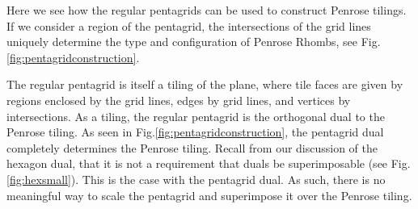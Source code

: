 \documentclass[
  oneside,
  11pt, a4paper,
  footinclude=true,
  headinclude=true,
  cleardoublepage=empty
]{scrbook}
\begin{document}
Here we see how the regular pentagrids can be used to construct Penrose tilings. If we consider a region of the pentagrid, the intersections of the grid lines uniquely determine the type and configuration of Penrose Rhombs, see Fig.\ref{fig:pentagridconstruction}. 

The regular pentagrid is itself a tiling of the plane, where tile faces are given by regions enclosed by the grid lines, edges by grid lines, and vertices by intersections. As a tiling, the regular pentagrid is the orthogonal dual to the Penrose tiling. As seen in Fig.\ref{fig:pentagridconstruction}, the pentagrid dual completely determines the Penrose tiling. Recall from our discussion of the hexagon dual, that it is not a requirement that duals be superimposable (see Fig.\ref{fig:hexsmall}). This is the case with the pentagrid dual. As such, there is no meaningful way to scale the pentagrid and superimpose it over the Penrose tiling. 
\end{document}
